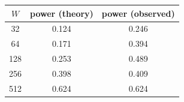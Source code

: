 \begin{tabular}{ccc}
\toprule
$W$ & power (theory) & power (observed) \\
\midrule
32 & 0.124 & 0.246 \\
64 & 0.171 & 0.394 \\
128 & 0.253 & 0.489 \\
256 & 0.398 & 0.409 \\
512 & 0.624 & 0.624 \\
\bottomrule
\end{tabular}
